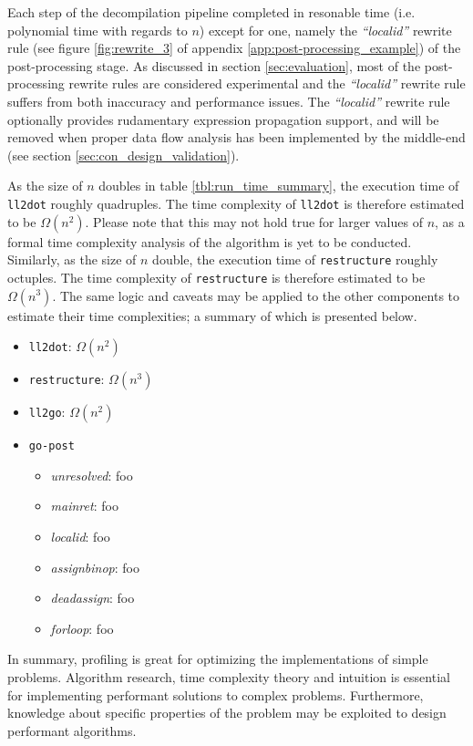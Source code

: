 Each step of the decompilation pipeline completed in resonable time (i.e. polynomial time with regards to $ n $) except for one, namely the \textit{``localid''} rewrite rule (see figure \ref{fig:rewrite_3} of appendix \ref{app:post-processing_example}) of the post-processing stage. As discussed in section \ref{sec:evaluation}, most of the post-processing rewrite rules are considered experimental and the \textit{``localid''} rewrite rule suffers from both inaccuracy and performance issues. The \textit{``localid''} rewrite rule optionally provides rudamentary expression propagation support, and will be removed when proper data flow analysis has been implemented by the middle-end (see section \ref{sec:con_design_validation}).

As the size of $ n $ doubles in table \ref{tbl:run_time_summary}, the execution time of \texttt{ll2dot} roughly quadruples. The time complexity of \texttt{ll2dot} is therefore estimated to be $ \Omega(n^{2}) $. Please note that this may not hold true for larger values of $ n $, as a formal time complexity analysis of the algorithm is yet to be conducted. Similarly, as the size of $ n $ double, the execution time of \texttt{restructure} roughly octuples. The time complexity of \texttt{restructure} is therefore estimated to be $ \Omega(n^{3}) $. The same logic and caveats may be applied to the other components to estimate their time complexities; a summary of which is presented below.


\begin{itemize}
	\item \texttt{ll2dot}: $ \Omega(n^{2}) $
	\item \texttt{restructure}: $ \Omega(n^{3}) $
	\item \texttt{ll2go}: $ \Omega(n^{2}) $
	\item \texttt{go-post}
	\begin{itemize}
		\item \textit{unresolved}: foo
		\item \textit{mainret}: foo
		\item \textit{localid}: foo
		\item \textit{assignbinop}: foo
		\item \textit{deadassign}: foo
		\item \textit{forloop}: foo
	\end{itemize}
\end{itemize}

In summary, profiling is great for optimizing the implementations of simple problems. Algorithm research, time complexity theory and intuition is essential for implementing performant solutions to complex problems. Furthermore, knowledge about specific properties of the problem may be exploited to design performant algorithms.




